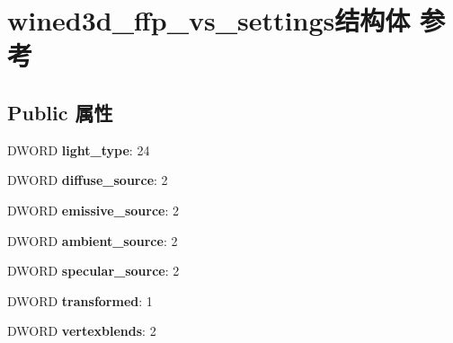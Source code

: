 \hypertarget{structwined3d__ffp__vs__settings}{}\section{wined3d\+\_\+ffp\+\_\+vs\+\_\+settings结构体 参考}
\label{structwined3d__ffp__vs__settings}
\subsection*{Public 属性}
\begin{DoxyCompactItemize}
\item 
\mbox{\label{structwined3d__ffp__vs__settings_ad49c6050dfff5266bd3632788fb1bb55}} 
D\+W\+O\+RD {\bfseries light\+\_\+type}\+: 24
\item 
\mbox{\label{structwined3d__ffp__vs__settings_a701b7f530bc675bb0e14a839b0eddb23}} 
D\+W\+O\+RD {\bfseries diffuse\+\_\+source}\+: 2
\item 
\mbox{\label{structwined3d__ffp__vs__settings_a7f20d28edf74cf6216621dfc4e7c9346}} 
D\+W\+O\+RD {\bfseries emissive\+\_\+source}\+: 2
\item 
\mbox{\label{structwined3d__ffp__vs__settings_aa429c74ec766fbfe14ed3f4ee7c5a5c0}} 
D\+W\+O\+RD {\bfseries ambient\+\_\+source}\+: 2
\item 
\mbox{\label{structwined3d__ffp__vs__settings_af41407fd9313a5eb02ca0f66f285c716}} 
D\+W\+O\+RD {\bfseries specular\+\_\+source}\+: 2
\item 
\mbox{\label{structwined3d__ffp__vs__settings_ac97b4785f80c7badadc86f5e13005445}} 
D\+W\+O\+RD {\bfseries transformed}\+: 1
\item 
\mbox{\label{structwined3d__ffp__vs__settings_ab4a5dee95b88a200d1825b9af4a699e7}} 
D\+W\+O\+RD {\bfseries vertexblends}\+: 2
\item 
\mbox{\label{structwined3d__ffp__vs__settings_a575d92c3fbc3284521f4f53600af108d}} 

\end{DoxyCompactItemize}
